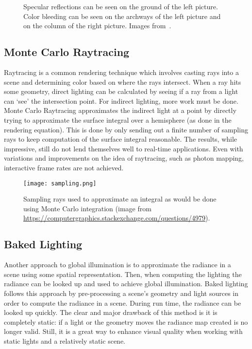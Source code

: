 \begin{figure}[h]
\centering
{}
\caption{Specular reflections can be seen on the ground of the left picture. Color bleeding can be seen on the archways of the left picture and on the column of the right picture. Images from~\cite{crassin2011interactive}.}
\label{fig:giqualities}
\end{figure}

\subsection{Monte Carlo Raytracing}
Raytracing is a common rendering technique which involves casting rays into a scene and determining color based on where the rays intersect. When a ray hits some geometry, direct lighting can be calculated by seeing if a ray from a light can `see' the intersection point. For indirect lighting, more work must be done. Monte Carlo Raytracing approximates the indirect light at a point by directly trying to approximate the surface integral over a hemisphere (as done in the rendering equation). This is done by only sending out a finite number of sampling rays to keep computation of the surface integral reasonable. The results, while impressive, still do not lend themselves well to real-time applications. Even with variations and improvements on the idea of raytracing, such as photon mapping, interactive frame rates are not achieved.

\begin{figure}[h]
\centering
\texttt{[image: sampling.png]}
\caption{Sampling rays used to approximate an integral as would be done using Monte Carlo integration (image from \url{https://computergraphics.stackexchange.com/questions/4979}).}
\label{fig:sampling}
\end{figure}

\subsection{Baked Lighting}
Another approach to global illumination is to approximate the radiance in a scene using some spatial representation. Then, when computing the lighting the radiance can be looked up and used to achieve global illumination. Baked lighting follows this approach by pre-processing a scene's geometry and light sources in order to compute the radiance in a scene. During run time, the radiance can be looked up quickly. The clear and major drawback of this method is it is completely static: if a light or the geometry moves the radiance map created is no longer valid. Still, it is a great way to enhance visual quality when working with static lights and a relatively static scene.

